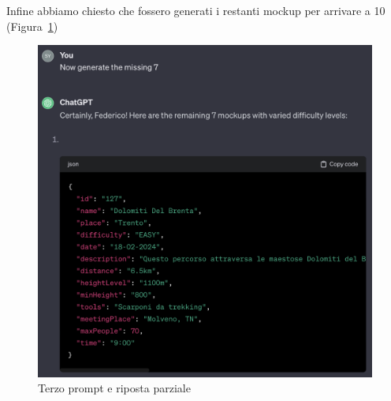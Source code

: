 Infine abbiamo chiesto che fossero generati i restanti mockup per arrivare a 10 (Figura~\ref*{fig:prompt4})
\begin{figure}[ht]
  \includegraphics[width=\linewidth]{images/prompt4.png}
  \caption{Terzo prompt e riposta parziale}\label{fig:prompt4}
\end{figure}